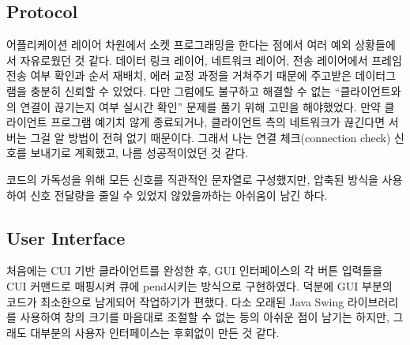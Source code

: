 \documentclass[a4paper, 10pt]{article}
\begin{document}
\subsection{Protocol}
어플리케이션 레이어 차원에서 소켓 프로그래밍을 한다는 점에서 여러 예외 상황들에서
자유로웠던 것 같다. 데이터 링크 레이어, 네트워크 레이어, 전송 레이어에서 프레임
전송 여부 확인과 순서 재배치, 에러 교정 과정을 거쳐주기 때문에 주고받은 데이터그램을
충분히 신뢰할 수 있었다. 다만 그럼에도 불구하고 해결할 수 없는 ``클라이언트와의 연결이
끊기는지 여부 실시간 확인'' 문제를 풀기 위해 고민을 해야했었다. 만약 클라이언트 프로그램
예기치 않게 종료되거나, 클라이언트 측의 네트워크가 끊긴다면 서버는 그걸 알 방법이
전혀 없기 때문이다. 그래서 나는 연결 체크(connection check) 신호를 보내기로
계획했고, 나름 성공적이었던 것 같다.

코드의 가독성을 위해 모든 신호를 직관적인 문자열로 구성했지만, 압축된 방식을 사용하여
신호 전달량을 줄일 수 있었지 않았을까하는 아쉬움이 남긴 하다.

\subsection{User Interface}
처음에는 CUI 기반 클라이언트를 완성한 후, GUI 인터페이스의 각 버튼 입력들을
CUI 커맨드로 매핑시켜 큐에 pend시키는 방식으로 구현하였다. 덕분에 GUI 부분의
코드가 최소한으로 남게되어 작업하기가 편했다. 다소 오래된 Java Swing 라이브러리를
사용하여 창의 크기를 마음대로 조절할 수 없는 등의 아쉬운 점이 남기는 하지만,
그래도 대부분의 사용자 인터페이스는 후회없이 만든 것 같다.
\end{document}

